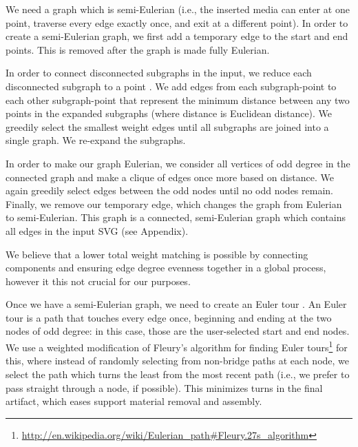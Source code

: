 We need a graph which is semi-Eulerian (i.e., the inserted media can enter at one point, traverse every edge exactly once, and exit at a different point).  In order to create a semi-Eulerian graph, we first add a temporary edge to the start and end points.  This is removed after the graph is made fully Eulerian.

In order to connect disconnected subgraphs in the input, we reduce each disconnected subgraph to a point .  We add edges from each subgraph-point to each other subgraph-point that represent the minimum distance between any two points in the expanded subgraphs (where distance is Euclidean distance).  We greedily select the smallest weight edges until all subgraphs are joined into a single graph.  We re-expand the subgraphs.

In order to make our graph Eulerian, we consider all vertices of odd degree in the connected graph and make a clique of edges once more based on distance.  We again greedily select edges between the odd nodes until no odd nodes remain.  Finally, we remove our temporary edge, which changes the graph from Eulerian to semi-Eulerian.  This graph is a connected, semi-Eulerian graph which contains all edges in the input SVG (see Appendix).

We believe that a lower total weight matching is possible by connecting components and ensuring edge degree evenness together in a global process, however it this not crucial for our purposes.

Once we have a semi-Eulerian graph, we need to create an Euler tour  .  An Euler tour is a path that touches every edge once, beginning and ending at the two nodes of odd degree: in this case, those are the user-selected start and end nodes.  We use a weighted modification of Fleury's algorithm for finding Euler tours\footnote{\url{http://en.wikipedia.org/wiki/Eulerian_path\#Fleury.27s_algorithm}} for this,  where instead of randomly selecting from non-bridge paths at each node, we select the path which turns the least from the most recent path (i.e., we prefer to pass straight through a node, if possible).  This minimizes turns in the final artifact, which eases support material removal and assembly.

